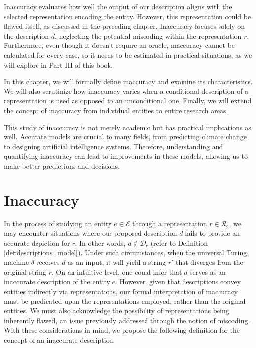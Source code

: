 Inaccuracy evaluates how well the output of our description aligns with the selected representation encoding the entity. However, this representation could be flawed itself, as discussed in the preceding chapter. Inaccuracy focuses solely on the description $d$, neglecting the potential miscoding within the representation $r$. Furthermore, even though it doesn't require an oracle, inaccuracy cannot be calculated for every case, so it needs to be estimated in practical situations, as we will explore in Part III of this book.

In this chapter, we will formally define inaccuracy and examine its characteristics. We will also scrutinize how inaccuracy varies when a conditional description of a representation is used as opposed to an unconditional one. Finally, we will extend the concept of inaccuracy from individual entities to entire research areas.

This study of inaccuracy is not merely academic but has practical implications as well. Accurate models are crucial to many fields, from predicting climate change to designing artificial intelligence systems. Therefore, understanding and quantifying inaccuracy can lead to improvements in these models, allowing us to make better predictions and decisions.

%
%

\section{Inaccuracy}
\label{sec:inaccuracy:inaccuracy}

In the process of studying an entity $e \in \mathcal{E}$ through a representation $r \in \mathcal{R}_e$, we may encounter situations where our proposed description $d$ fails to provide an accurate depiction for $r$. In other words, $d \notin \mathcal{D}_r$ (refer to Definition \ref{def:descriptions_model}). Under such circumstances, when the universal Turing machine $\delta$ receives $d$ as an input, it will yield a string $r'$ that diverges from the original string $r$. On an intuitive level, one could infer that $d$ serves as an inaccurate description of the entity $e$. However, given that descriptions convey entities indirectly via representations, our formal interpretation of inaccuracy must be predicated upon the representations employed, rather than the original entities. We must also acknowledge the possibility of representations being inherently flawed, an issue previously addressed through the notion of miscoding. With these considerations in mind, we propose the following definition for the concept of an inaccurate description.

